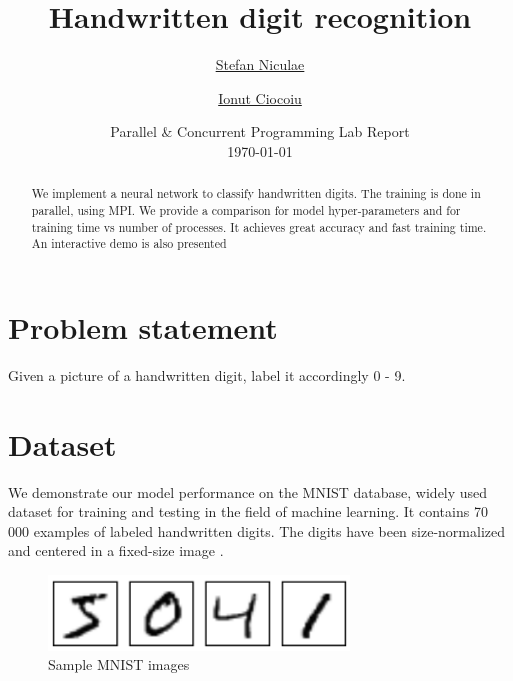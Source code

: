 \documentclass[a4paper]{article}
\begin{document}
	\title{
	\Huge Handwritten digit recognition
	}
	
	\vspace{2cm}
	
	\author{\Large \href{mailto:stefan.niculae@my.fmi.unibuc.ro}{Stefan Niculae} \and \Large \href{mailto:ionut.ciocoiu@my.fmi.unibuc.ro}{Ionut Ciocoiu}
	\vspace{3cm}}
	
	\date{
	\large Parallel \& Concurrent Programming Lab Report \\
    \vspace{0.2cm}
	\today
	}

	\maketitle
	\setlength{\parindent}{0pt}

\vspace{5cm}
\begin{abstract}
We implement a neural network to classify handwritten digits. The training is done in parallel, using MPI. We provide a comparison for model hyper-parameters and for training time vs number of processes. It achieves great accuracy and fast training time. An interactive demo is also presented
\end{abstract}



\newpage
\tableofcontents



\newpage
\section{Problem statement}
\label{sec:problem}
Given a picture of a handwritten digit, label it accordingly 0 - 9.

\section{Dataset}
\label{sec:dataset}
We demonstrate our model performance on the MNIST database, widely used dataset for training and testing in the field of machine learning. It contains 70 000 examples of labeled handwritten digits. The digits have been size-normalized and centered in a fixed-size image \cite{mnist}. 

\begin{figure}[htb]
\centering
\includegraphics[width=8cm]{images/mnist-images.png}
\caption{Sample MNIST images \cite{tf}}
\end{figure}
\end{document}
